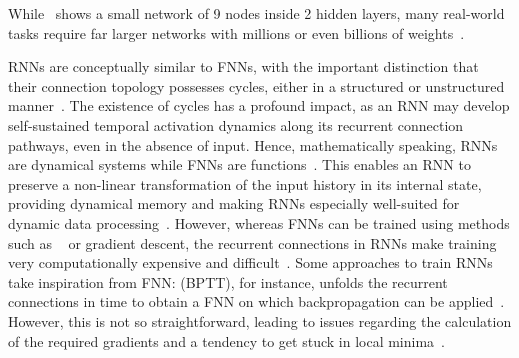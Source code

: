 While~ shows a small network of 9 nodes inside 2 hidden layers, many real-world tasks require far larger networks with millions or even billions of weights~\cite{ImageNet,BLOOM_CarbonFootprint_176Bparam,GPT-J-6B}. \par
RNNs are conceptually similar to FNNs, with the important distinction that their connection topology possesses cycles, either in a structured or unstructured manner~\cite{lukovsevivcius2009reservoir,Hopfield1982}.
The existence of cycles has a profound impact, as an RNN may develop self-sustained temporal activation dynamics along its recurrent connection pathways, even in the absence of input.
Hence, mathematically speaking, RNNs are dynamical systems while FNNs are functions~\cite{lukovsevivcius2009reservoir}. %
This enables an RNN to preserve a non-linear transformation of the input history in its internal state, providing dynamical memory and making RNNs especially well-suited for dynamic data processing~\cite{RC_RecentAdvances,ApproximationRNN}.
However, whereas FNNs can be trained using methods such as ~\cite{Backpropagation} or gradient descent, the recurrent connections in RNNs make training very computationally expensive and difficult~\cite{DifficultyTrainingRNN,EvaluatingRestrictedESNs,Moon_2021,RC_SuperconductingElectronics,funahashi1992neural}.
Some approaches to train RNNs take inspiration from FNN:  (BPTT), for instance, unfolds the recurrent connections in time to obtain a FNN on which backpropagation can be applied~\cite{jaeger2002tutorial}.
However, this is not so straightforward, leading to issues regarding the calculation of the required gradients and a tendency to get stuck in local minima~\cite{RC_Tensegrity,DifficultyTrainingRNN,D-ESN-Improved}. %

\vspace{-1em}
\vspace{-1em}

